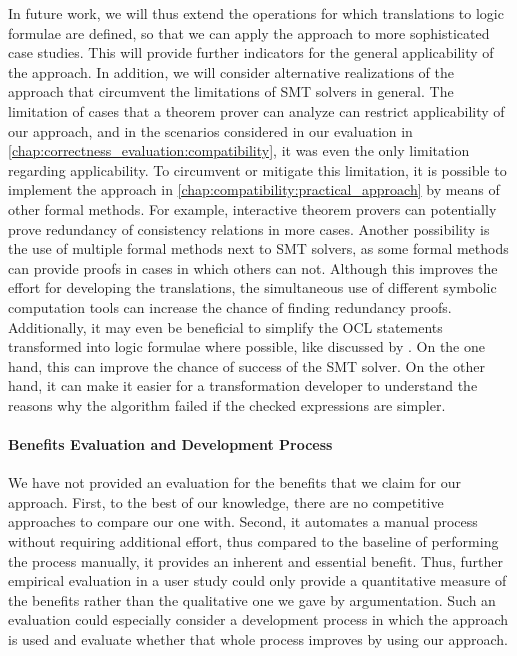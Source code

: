 In future work, we will thus extend the operations for which translations to logic formulae are defined, so that we can apply the approach to more sophisticated case studies.
This will provide further indicators for the general applicability of the approach.
%
In addition, we will consider alternative realizations of the approach that circumvent the limitations of \gls{SMT} solvers in general.
The limitation of cases that a theorem prover can analyze can restrict applicability of our approach, and in the scenarios considered in our evaluation in \autoref{chap:correctness_evaluation:compatibility}, it was even the only limitation regarding applicability.
To circumvent or mitigate this limitation, it is possible to implement the approach in \autoref{chap:compatibility:practical_approach} by means of other formal methods. 
For example, interactive theorem provers can potentially prove redundancy of consistency relations in more cases. 
Another possibility is the use of multiple formal methods next to \gls{SMT} solvers, as some formal methods can provide proofs in cases in which others can not.
Although this improves the effort for developing the translations, the simultaneous use of different symbolic computation tools can increase the chance of finding redundancy proofs.
Additionally, it may even be beneficial to simplify the \gls{OCL} statements transformed into logic formulae where possible, like discussed by \textcite{cuadrado2019OclOptimization-SoSym}.
On the one hand, this can improve the chance of success of the \gls{SMT} solver.
On the other hand, it can make it easier for a transformation developer to understand the reasons why the algorithm failed if the checked expressions are simpler.

\paragraph{Benefits Evaluation and Development Process}
We have not provided an evaluation for the benefits that we claim for our approach.
First, to the best of our knowledge, there are no competitive approaches to compare our one with.
Second, it automates a manual process without requiring additional effort, thus compared to the baseline of performing the process manually, it provides an inherent and essential benefit.
Thus, further empirical evaluation in a user study could only provide a quantitative measure of the benefits rather than the qualitative one we gave by argumentation.
Such an evaluation could especially consider a development process in which the approach is used and evaluate whether that whole process improves by using our approach.

